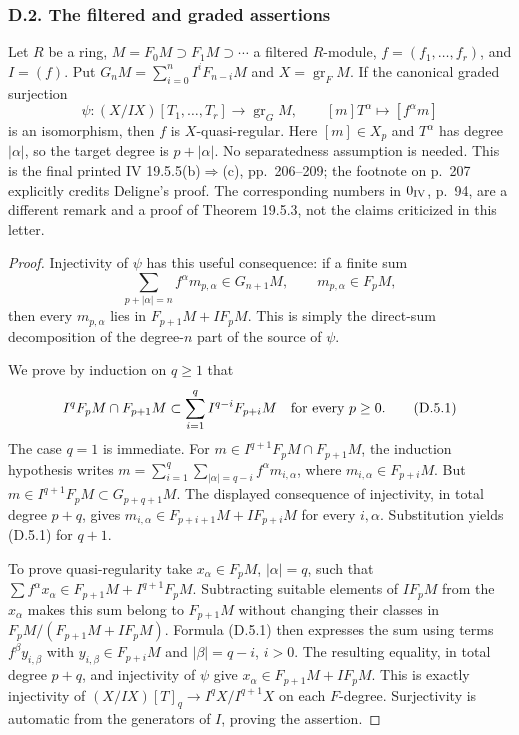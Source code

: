 \subsubsection{D.2. The filtered and graded assertions}

\begin{proposition}\label{SA23-D-5}
Let $R$ be a ring, $M=F_0M\supset F_1M\supset\cdots$ a filtered
$R$-module, $f=(f_1,\ldots,f_r)$, and $I=(f)$.  Put
$G_nM=\sum_{i=0}^n I^iF_{n-i}M$ and $X=\operatorname{gr}_F M$.
If the canonical graded surjection
\[
 \psi:(X/IX)[T_1,\ldots,T_r]\longrightarrow
       \operatorname{gr}_G M,
 \qquad [m]T^\alpha\longmapsto[f^\alpha m]
\]
is an isomorphism, then $f$ is $X$-quasi-regular.  Here $[m]\in X_p$
and $T^\alpha$ has degree $|\alpha|$, so the target degree is
$p+|\alpha|$.  No separatedness assumption is needed.
This is the final printed IV 19.5.5(b)$\Rightarrow$(c), pp.~206--209;
the footnote on p.~207 explicitly credits Deligne's proof.  The
corresponding numbers in $0_{\rm IV}$, p.~94, are a different remark
and a proof of Theorem 19.5.3, not the claims criticized in this letter.
\end{proposition}
\begin{proof}
Injectivity of $\psi$ has this useful consequence: if a finite sum
\[
 \sum_{p+|\alpha|=n} f^\alpha m_{p,\alpha}\in G_{n+1}M,
 \qquad m_{p,\alpha}\in F_pM,
\]
then every $m_{p,\alpha}$ lies in $F_{p+1}M+IF_pM$.
This is simply the direct-sum decomposition of the degree-$n$
part of the source of $\psi$.

We prove by induction on $q\geq1$ that
\[
 I^qF_pM\cap F_{p+1}M
 \subset\sum_{i=1}^q I^{q-i}F_{p+i}M
 \quad\hbox{for every }p\geq0.                         \tag{D.5.1}
\]
The case $q=1$ is immediate.  For
$m\in I^{q+1}F_pM\cap F_{p+1}M$, the induction hypothesis writes
$m=\sum_{i=1}^q\sum_{|\alpha|=q-i}f^\alpha m_{i,\alpha}$,
where $m_{i,\alpha}\in F_{p+i}M$.  But
$m\in I^{q+1}F_pM\subset G_{p+q+1}M$.  The displayed consequence
of injectivity, in total degree $p+q$, gives
$m_{i,\alpha}\in F_{p+i+1}M+IF_{p+i}M$ for every $i,\alpha$.
Substitution yields (D.5.1) for $q+1$.

To prove quasi-regularity take $x_\alpha\in F_pM$, $|\alpha|=q$,
such that
$\sum f^\alpha x_\alpha\in F_{p+1}M+I^{q+1}F_pM$.
Subtracting suitable elements of $IF_pM$ from the $x_\alpha$
makes this sum belong to $F_{p+1}M$ without changing their classes
in $F_pM/(F_{p+1}M+IF_pM)$.  Formula (D.5.1) then expresses the
sum using terms $f^\beta y_{i,\beta}$ with
$y_{i,\beta}\in F_{p+i}M$ and $|\beta|=q-i$, $i>0$.
The resulting equality, in total degree $p+q$, and injectivity of
$\psi$ give $x_\alpha\in F_{p+1}M+IF_pM$.  This is exactly
injectivity of
$(X/IX)[T]_q\to I^qX/I^{q+1}X$ on each $F$-degree.  Surjectivity
is automatic from the generators of $I$, proving the assertion.
\end{proof}


